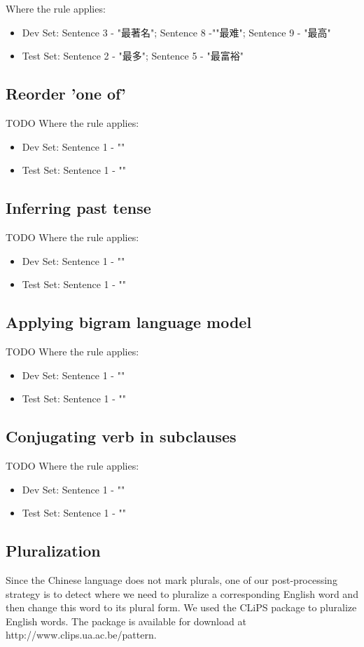 \documentclass[11pt]{article} %
\begin{document}
\begin{CJK}{UTF8}{gbsn}
Where the rule applies:
\begin{itemize}
\item Dev Set: Sentence 3 - "最著名"; Sentence 8 -""最难"; Sentence 9 - "最高"
\item Test Set: Sentence 2 - "最多"; Sentence 5 - "最富裕"
\end{itemize}

\subsection{Reorder 'one of'}
TODO
Where the rule applies:
\begin{itemize}
\item Dev Set: Sentence 1 - ""
\item Test Set: Sentence 1 - ""
\end{itemize}

\subsection{Inferring past tense}
TODO
Where the rule applies:
\begin{itemize}
\item Dev Set: Sentence 1 - ""
\item Test Set: Sentence 1 - ""
\end{itemize}

\subsection{Applying bigram language model}
TODO
Where the rule applies:
\begin{itemize}
\item Dev Set: Sentence 1 - ""
\item Test Set: Sentence 1 - ""
\end{itemize}

\subsection{Conjugating verb in subclauses}
TODO
Where the rule applies:
\begin{itemize}
\item Dev Set: Sentence 1 - ""
\item Test Set: Sentence 1 - ""
\end{itemize}

\subsection{Pluralization}
Since the Chinese language does not mark plurals, one of our post-processing strategy is to detect where we need to pluralize a corresponding English word and then change this word to its plural form. We used the CLiPS package to pluralize English words. The package is available for download at http://www.clips.ua.ac.be/pattern.


\end{CJK}
\end{document}
